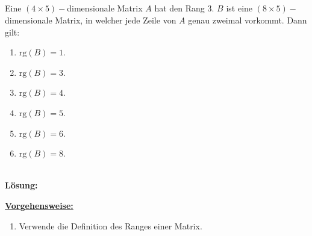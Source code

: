 \subsection*{}
Eine $ (4 \times 5)- $dimensionale Matrix $ A $ hat den Rang $ 3 $.
$ B $ ist eine $ (8 \times 5)- $dimensionale Matrix, in welcher jede Zeile von $ A $ genau zweimal vorkommt. Dann gilt:
\renewcommand{\labelenumi}{(\alph{enumi})}
\begin{enumerate}
	\item 
	$ \mathrm{rg}(B) = 1 $.
	\item
	$ \mathrm{rg}(B) = 3 $.
	\item
	$ \mathrm{rg}(B) = 4 $.
	\item
	$ \mathrm{rg}(B) = 5 $.
	\item
	$ \mathrm{rg}(B) = 6 $.
	\item
	$ \mathrm{rg}(B) = 8 $.
\end{enumerate}
\ \\
\textbf{Lösung:}
\begin{mdframed}
\underline{\textbf{Vorgehensweise:}}
\renewcommand{\labelenumi}{\theenumi.}
\begin{enumerate}
\item Verwende die Definition des Ranges einer Matrix.
\end{enumerate}
\end{mdframed}

